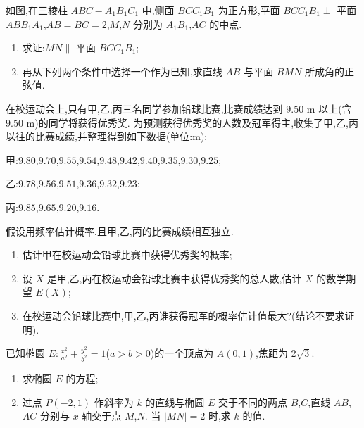 \begin{problem}
如图,在三棱柱 \(ABC-A_1B_1C_1\) 中,侧面 \(BCC_1B_1\) 为正方形,平面 \(BCC_1B_1\perp\) 平面 \(ABB_1A_1\),\(AB=BC=2\),\(M\),\(N\) 分别为 \(A_1B_1\),\(AC\) 的中点.



\begin{enumerate}
\item 求证:\(MN\parallel\) 平面 \(BCC_1B_1\);

\item 再从下列两个条件中选择一个作为已知,求直线 \(AB\) 与平面 \(BMN\) 所成角的正弦值.


\end{enumerate}

\end{problem}


\begin{problem}
在校运动会上,只有甲,乙,丙三名同学参加铅球比赛,比赛成绩达到 \(9.50\text{ m}\) 以上(含 \(9.50\text{ m}\))的同学将获得优秀奖. 为预测获得优秀奖的人数及冠军得主,收集了甲,乙,丙以往的比赛成绩,并整理得到如下数据(单位:\(\mathrm{m}\)):

甲:\(9.80\),\(9.70\),\(9.55\),\(9.54\),\(9.48\),\(9.42\),\(9.40\),\(9.35\),\(9.30\),\(9.25\);

乙:\(9.78\),\(9.56\),\(9.51\),\(9.36\),\(9.32\),\(9.23\);

丙:\(9.85\),\(9.65\),\(9.20\),\(9.16\).

假设用频率估计概率,且甲,乙,丙的比赛成绩相互独立.

\begin{enumerate}
\item 估计甲在校运动会铅球比赛中获得优秀奖的概率;

\item 设 \(X\) 是甲,乙,丙在校运动会铅球比赛中获得优秀奖的总人数,估计 \(X\) 的数学期望 \(E(X)\);

\item 在校运动会铅球比赛中,甲,乙,丙谁获得冠军的概率估计值最大?(结论不要求证明).
\end{enumerate}
\end{problem}


\begin{problem}
已知椭圆 \(E:\frac{x^2}{a^2}+\frac{y^2}{b^2}=1\)(\(a>b>0\))的一个顶点为 \(A(0,1)\),焦距为 \(2\sqrt3\).

\begin{enumerate}
\item 求椭圆 \(E\) 的方程;

\item 过点 \(P(-2,1)\) 作斜率为 \(k\) 的直线与椭圆 \(E\) 交于不同的两点 \(B\),\(C\),直线 \(AB\),\(AC\) 分别与 \(x\) 轴交于点 \(M\),\(N\). 当 \(|MN|=2\) 时,求 \(k\) 的值.
\end{enumerate}
\end{problem}



